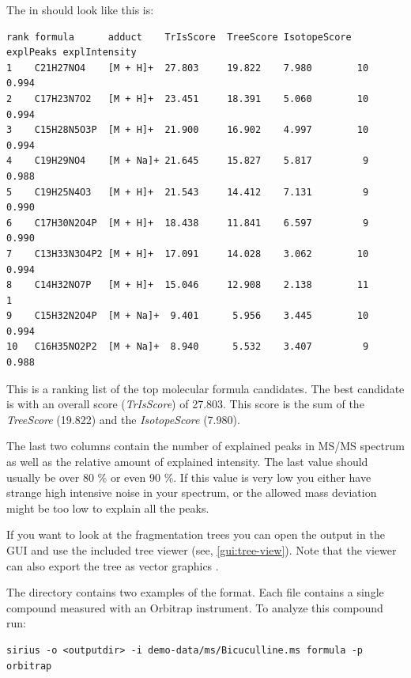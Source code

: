 \documentclass[letterpaper,10pt,openany,oneside]{sphinxmanual}
\newcommand\gui[1]{\textsl{\guilsinglleft#1\guilsinglright\xspace}}
\begin{document}
The  in  should look like this is:
%

\begin{Verbatim}[commandchars=\\\{\}]
rank formula      adduct    TrIsScore  TreeScore IsotopeScore explPeaks explIntensity
1    C21H27NO4    [M + H]+  27.803     19.822    7.980        10        0.994
2    C17H23N7O2   [M + H]+  23.451     18.391    5.060        10        0.994
3    C15H28N5O3P  [M + H]+  21.900     16.902    4.997        10        0.994
4    C19H29NO4    [M + Na]+ 21.645     15.827    5.817         9        0.988
5    C19H25N4O3   [M + H]+  21.543     14.412    7.131         9        0.990
6    C17H30N2O4P  [M + H]+  18.438     11.841    6.597         9        0.990
7    C13H33N3O4P2 [M + H]+  17.091     14.028    3.062        10        0.994
8    C14H32NO7P   [M + H]+  15.046     12.908    2.138        11        1
9    C15H32N2O4P  [M + Na]+  9.401      5.956    3.445        10        0.994
10   C16H35NO2P2  [M + Na]+  8.940      5.532    3.407         9        0.988

\end{Verbatim}

This is a ranking list of the top molecular formula candidates. The best
candidate is  with an overall score (\gui{TrIsScore}) of 27.803. This score is the
sum of the \gui{TreeScore} (19.822) and the \gui{IsotopeScore} (7.980). 

The last two columns contain the number of explained peaks in MS/MS spectrum
as well as the relative amount of explained intensity. The last value should
usually be over 80 \% or even 90 \%. If this value is very low you either
have strange high intensive noise in your spectrum, or the allowed mass
deviation might be too low to explain all the peaks.

If you want to look at the fragmentation trees you can open the output  in the GUI and use
the included tree viewer (see, \ref{gui:tree-view}). Note that the viewer can also export the tree as vector graphics .   

The directory  contains two examples of the  format. Each file contains a single compound measured with an Orbitrap instrument. To analyze this compound run:

\begin{Verbatim}[commandchars=\\\{\}]
sirius -o <outputdir> -i demo-data/ms/Bicuculline.ms formula -p orbitrap
\end{Verbatim}
\end{document}
